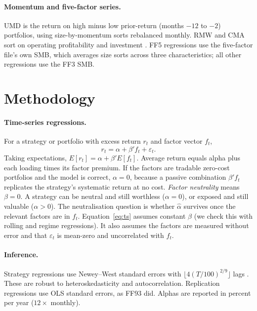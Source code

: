 \documentclass[11pt]{article}
\begin{document}
\paragraph{Momentum and five-factor series.} UMD is the return on high minus low prior-return (months $-12$ to $-2$) portfolios, using size-by-momentum sorts rebalanced monthly. RMW and CMA sort on operating profitability and investment \citep{FF2015}. FF5 regressions use the five-factor file's own SMB, which averages size sorts across three characteristics; all other regressions use the FF3 SMB.

\section{Methodology}\label{sec:method}

\paragraph{Time-series regressions.} For a strategy or portfolio with excess return $r_t$ and factor vector $f_t$,
\begin{equation}
r_t = \alpha + \beta' f_t + \varepsilon_t . \label{eq:ts}
\end{equation}
Taking expectations, $E[r_t] = \alpha + \beta' E[f_t]$. Average return equals alpha plus each loading times its factor premium. If the factors are tradable zero-cost portfolios and the model is correct, $\alpha=0$, because a passive combination $\beta' f_t$ replicates the strategy's systematic return at no cost. \emph{Factor neutrality} means $\beta=0$. A strategy can be neutral and still worthless ($\alpha=0$), or exposed and still valuable ($\alpha>0$). The neutralisation question is whether $\hat\alpha$ survives once the relevant factors are in $f_t$. Equation~\eqref{eq:ts} assumes constant $\beta$ (we check this with rolling and regime regressions). It also assumes the factors are measured without error and that $\varepsilon_t$ is mean-zero and uncorrelated with $f_t$.

\paragraph{Inference.} Strategy regressions use Newey--West standard errors \citep{NW1987} with $\lfloor 4(T/100)^{2/9}\rfloor$ lags \citep{NW1994}. These are robust to heteroskedasticity and autocorrelation. Replication regressions use OLS standard errors, as FF93 did. Alphas are reported in percent per year ($12\times$ monthly).
\end{document}

